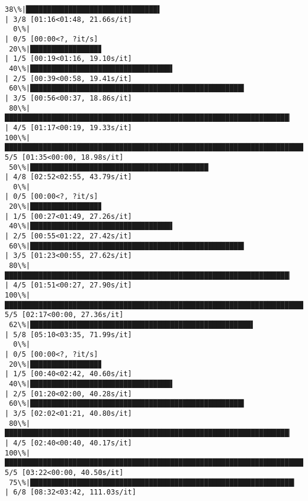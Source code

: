 \documentclass[11pt]{article}
\begin{document}
\begin{Verbatim}[commandchars=\\\{\}]
 38\%|███████████████████████████████▌                                                    | 3/8 [01:16<01:48, 21.66s/it]
  0\%|                                                                                            | 0/5 [00:00<?, ?it/s]
 20\%|████████████████▊                                                                   | 1/5 [00:19<01:16, 19.10s/it]
 40\%|█████████████████████████████████▌                                                  | 2/5 [00:39<00:58, 19.41s/it]
 60\%|██████████████████████████████████████████████████▍                                 | 3/5 [00:56<00:37, 18.86s/it]
 80\%|███████████████████████████████████████████████████████████████████▏                | 4/5 [01:17<00:19, 19.33s/it]
100\%|████████████████████████████████████████████████████████████████████████████████████| 5/5 [01:35<00:00, 18.98s/it]
 50\%|██████████████████████████████████████████                                          | 4/8 [02:52<02:55, 43.79s/it]
  0\%|                                                                                            | 0/5 [00:00<?, ?it/s]
 20\%|████████████████▊                                                                   | 1/5 [00:27<01:49, 27.26s/it]
 40\%|█████████████████████████████████▌                                                  | 2/5 [00:55<01:22, 27.42s/it]
 60\%|██████████████████████████████████████████████████▍                                 | 3/5 [01:23<00:55, 27.62s/it]
 80\%|███████████████████████████████████████████████████████████████████▏                | 4/5 [01:51<00:27, 27.90s/it]
100\%|████████████████████████████████████████████████████████████████████████████████████| 5/5 [02:17<00:00, 27.36s/it]
 62\%|████████████████████████████████████████████████████▌                               | 5/8 [05:10<03:35, 71.99s/it]
  0\%|                                                                                            | 0/5 [00:00<?, ?it/s]
 20\%|████████████████▊                                                                   | 1/5 [00:40<02:42, 40.60s/it]
 40\%|█████████████████████████████████▌                                                  | 2/5 [01:20<02:00, 40.28s/it]
 60\%|██████████████████████████████████████████████████▍                                 | 3/5 [02:02<01:21, 40.80s/it]
 80\%|███████████████████████████████████████████████████████████████████▏                | 4/5 [02:40<00:40, 40.17s/it]
100\%|████████████████████████████████████████████████████████████████████████████████████| 5/5 [03:22<00:00, 40.50s/it]
 75\%|██████████████████████████████████████████████████████████████▎                    | 6/8 [08:32<03:42, 111.03s/it]

\end{Verbatim}
\end{document}
